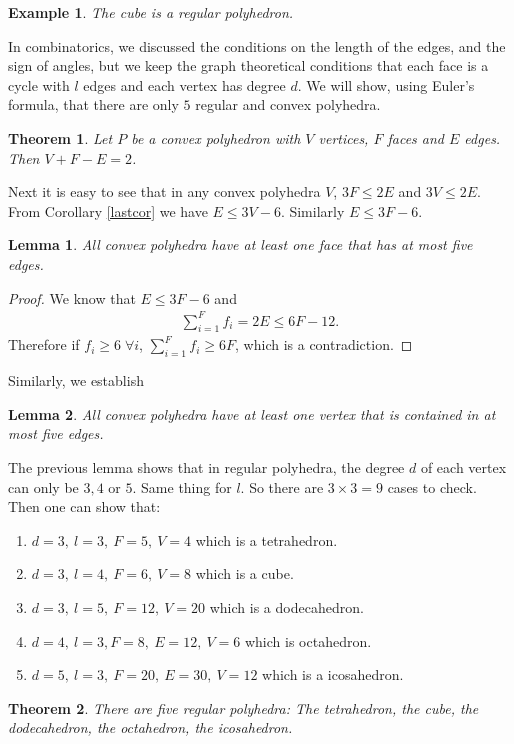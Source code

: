 \documentclass[12pt,a4paper]{article}
\newtheorem{lem}{Lemma}[section]
\newtheorem{thm}{Theorem}[section]
\newtheorem{exmp}{Example}[section]
\theoremstyle{definition}
\begin{document}
\begin{exmp}The cube is a regular polyhedron. 
\end{exmp}
\newpage
In combinatorics, we discussed the conditions on the length of the edges, and the sign of angles, but we keep the graph theoretical conditions that each face is a cycle with $l$ edges and each vertex has degree $d$. We will show, using Euler's formula, that there are only $5$ regular and convex polyhedra. 
\begin{thm} Let $P$ be a convex polyhedron with $V$ vertices, $F$ faces and $E$ edges. Then $V+F-E=2$. 
\end{thm}
Next it is easy to see that in any convex polyhedra $V$,  $3F \leq 2E$ and $3V \leq 2E$. From Corollary \ref{lastcor} we have $E \leq 3V-6$. Similarly $E \leq 3F-6$. 
\begin{lem} All convex polyhedra have at least one face that has at most five edges.
\end{lem}
\begin{proof}
We know that $E \leq 3F-6$ and 
\begin{align*}
\sum_{i=1}^F f_i = 2E \leq 6F-12.
\end{align*}
Therefore if $f_i \geq 6 \; \forall i$,  $\sum_{i=1}^F f_i \geq 6F$, which is a contradiction.
\end{proof}
Similarly, we establish
\begin{lem} All convex polyhedra have at least one vertex that is contained in at most five edges. 
\end{lem}
The previous lemma shows that in regular polyhedra, the degree $d$ of each vertex can only be $3,4$ or $5$. Same thing for $l$. So there are $3\times3 = 9$ cases to check. Then one can show that:
\begin{enumerate}
\item $d=3, \ l=3, \ F=5, \ V=4$ which is a tetrahedron.
\item $d=3, \ l=4, \ F=6, \ V=8$ which is a cube.
\item $d=3, \ l=5, \ F=12, \ V = 20$ which is a dodecahedron.
\item $d=4, \ l=3,  F=8, \ E=12, \ V=6$ which is octahedron.
\item $d=5, \ l=3, \ F=20, \ E=30, \ V=12$ which is a icosahedron.
\end{enumerate}
\begin{thm} There are five regular polyhedra: The tetrahedron, the cube, the dodecahedron, the octahedron, the icosahedron. 
\end{thm}
\end{document}
